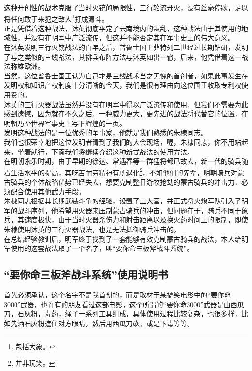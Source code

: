 \begin{multicols}{\theparacolNo}
这种开创性的战术克服了当时火铳的局限性，三行轮流开火，没有丝毫停歇，足以将任何敢于来犯之敌人\footnote{包括大象。}打成漏斗。\\

正是凭借着这种战法，沐英彻底平定了云南境内的叛乱，这种战法由于其使用的地域性，并没有在明军中广泛流传，但这并不能否定其在军事史上的伟大意义。\\

在沐英发明三行火铳战法的百年之后，普鲁士国王菲特列二世经过长期钻研，发明了与之类似的三线战法，其排兵布阵方法与沐英如出一辙，后来，他凭借着这一战法称雄欧洲。\\

当然，这位普鲁士国王认为自己才是三线战术当之无愧的首创者，如果此事发生在发明权和知识产权制度十分清晰的今天，我们是很有理由向这位国王收取专利权使用费的。\\

沐英的三行火器战法虽然并没有在明军中得以广泛流传和使用，但我们不需要为此感到遗憾，因为就在不久之后，一种威力更大，更先进的战法将代替它的位置，在明朝乃至世界军事史上写下辉煌的一页。\\

发明这种战法的是一位优秀的军事家，他就是我们熟悉的朱棣同志。\\

我们也很荣幸地把这位发明者请到了我们的大会现场，喔，朱棣同志，你不用站起来，坐着就行，下面我们将继续介绍这种新式战法的使用方法。\\

在明朝永乐时期，由于早期的徐达、常遇春等一群猛将都已故去，新一代的骑兵随着生活水平的提高，其吃苦耐劳精神有所退化\footnote{并非玩笑。}，不如他们的先辈，明朝骑兵对蒙古骑兵的个体战略优势已经失去，想要克制整日游牧抢劫的蒙古骑兵的冲击力，必须配合使用其他武力手段。\\

朱棣同志根据其长期武装斗争的经验，设置了三大营，并正式将火炮军队引入了明军的战斗序列，他希望用火器来压制蒙古骑兵的冲击，但问题在于，骑兵不同于象兵，其速度极快，由于当时火器杀伤力和射击距离以及换火药时间上的限制，即使朱棣使用沐英的三行火器战法，也是无法抵御骑兵冲击的。\\

在总结经验教训后，明军终于找到了一套能够有效克制蒙古骑兵的战法，本人给明军使用的这套战法取了一个名字，叫“要你命三板斧战斗系统”。\\

\subsection{“要你命三板斧战斗系统”使用说明书}
首先必须承认，这个名字不是我首创的，而是取材于某搞笑电影中的“要你命3000”武器，也许有的朋友看过这部电影，这个所谓的“要你命3000”武器是由西瓜刀，石灰粉，毒药，绳子一系列工具组成，具体使用过程比较复杂，也很多样，比如先洒石灰粉遮住对方眼睛，然后用西瓜刀砍，或是下毒等等。\\


\end{multicols}
